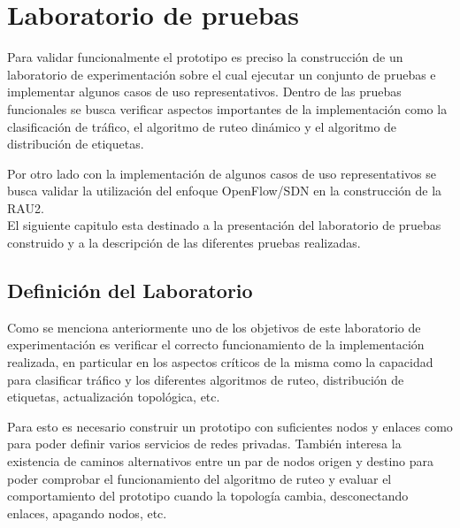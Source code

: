 \chapter{Laboratorio de pruebas}
\label{chapter6}

\ifpdf
    \graphicspath{{Chapter6/Figs/Raster/}{Chapter6/Figs/PDF/}{Chapter6/Figs/}}
\else
    \graphicspath{{Chapter6/Figs/Vector/}{Chapter6/Figs/}}
\fi

Para validar funcionalmente el prototipo es preciso la construcción de un laboratorio de experimentación sobre el cual ejecutar un conjunto de pruebas e implementar algunos casos de uso representativos. Dentro de las pruebas funcionales se busca verificar aspectos importantes de la implementaci\'on como la clasificación de tr\'afico, el algoritmo de ruteo dinámico y el algoritmo de distribución de etiquetas.

Por otro lado con la implementaci\'on de algunos casos de uso representativos se busca validar la utilización del enfoque OpenFlow/SDN en la construcci\'on de la RAU2.\\

El siguiente capitulo esta destinado a la presentación del laboratorio de pruebas construido y a la descripción de las diferentes pruebas realizadas.

\section{Definición del Laboratorio}

Como se menciona anteriormente uno de los objetivos de este laboratorio de experimentaci\'on es verificar el correcto funcionamiento de la implementaci\'on realizada, en particular en los aspectos críticos de la misma como la capacidad para clasificar tr\'afico y los diferentes algoritmos de ruteo, distribución de etiquetas, actualización topol\'ogica, etc. 

Para esto es necesario construir un prototipo con suficientes nodos y enlaces como para poder definir varios servicios de redes privadas. Tambi\'en interesa la existencia de caminos alternativos entre un par de nodos origen y destino para poder comprobar el funcionamiento del algoritmo de ruteo y evaluar el comportamiento del prototipo cuando la topolog\'ia cambia, desconectando enlaces, apagando nodos, etc.\\

